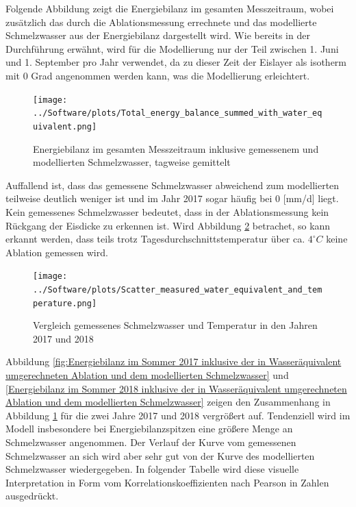 \documentclass[12pt,a4paper]{article}
\begin{document}
Folgende Abbildung zeigt die Energiebilanz im gesamten Messzeitraum, wobei zusätzlich das durch die Ablationsmessung errechnete und das modellierte Schmelzwasser aus der Energiebilanz dargestellt wird. Wie bereits in der Durchführung erwähnt, wird für die Modellierung nur der Teil zwischen 1. Juni und 1. September pro Jahr verwendet, da zu dieser Zeit der Eislayer als isotherm mit 0 Grad angenommen werden kann, was die Modellierung erleichtert.  






\begin{figure}[H]
\centering
\texttt{[image: ../Software/plots/Total\_energy\_balance\_summed\_with\_water\_equivalent.png]}
\caption{Energiebilanz im gesamten Messzeitraum inklusive gemessenem und modellierten Schmelzwasser, tagweise gemittelt}
\label{fig:Energiebilanz im gesamten Messzeitraum inklusive gemessenem und modellierten Schmelzwasser}
\end{figure}

Auffallend ist, dass das gemessene Schmelzwasser abweichend zum modellierten teilweise deutlich weniger ist und im Jahr 2017 sogar häufig bei 0 [mm/d] liegt. Kein gemessenes Schmelzwasser bedeutet, dass in der Ablationsmessung kein Rückgang der Eisdicke zu erkennen ist. Wird Abbildung \ref{Vergleich gemessenes Schmelzwasser und Temperatur} betrachet, so kann erkannt werden, dass teils trotz Tagesdurchschnittstemperatur über ca. $4^\circ C$ keine Ablation gemessen wird.

\begin{figure}[H]
\centering
\texttt{[image: ../Software/plots/Scatter\_measured\_water\_equivalent\_and\_temperature.png]}
\caption{Vergleich gemessenes Schmelzwasser und Temperatur in den Jahren 2017 und 2018}
\label{Vergleich gemessenes Schmelzwasser und Temperatur}
\end{figure}




Abbildung \ref{fig:Energiebilanz im Sommer 2017 inklusive der in Wasseräquivalent umgerechneten Ablation und dem modellierten Schmelzwasser} und \ref{Energiebilanz im Sommer 2018 inklusive der in Wasseräquivalent umgerechneten Ablation und dem modellierten Schmelzwasser} zeigen den Zusammenhang in Abbildung \ref{fig:Energiebilanz im gesamten Messzeitraum inklusive gemessenem und modellierten Schmelzwasser} für die zwei Jahre 2017 und 2018 vergrößert auf. Tendenziell wird im Modell insbesondere bei Energiebilanzspitzen eine größere Menge an Schmelzwasser angenommen. Der Verlauf der Kurve vom gemessenen Schmelzwasser an sich wird aber sehr gut von der Kurve des modellierten Schmelzwasser wiedergegeben. In folgender Tabelle wird diese visuelle Interpretation in Form vom Korrelationskoeffizienten nach Pearson in Zahlen ausgedrückt. 
\end{document}
